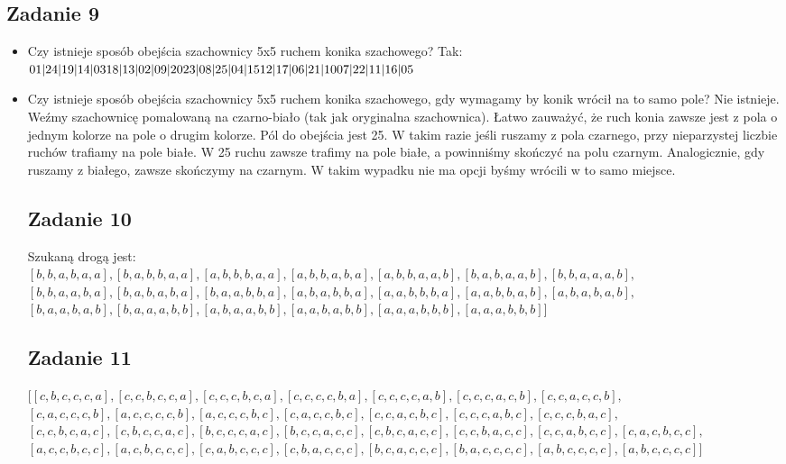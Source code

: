 \documentclass[a4paper]{article}
\begin{document}
\subsection*{Zadanie 9}
\begin{itemize}
\item Czy istnieje sposób obejścia szachownicy 5x5 ruchem konika szachowego?
Tak:\\

$
01|24|19|14|03 \\
18|13|02|09|20 \\
23|08|25|04|15 \\
12|17|06|21|10 \\
07|22|11|16|05 \\ 
$

\item Czy istnieje sposób obejścia szachownicy 5x5 ruchem konika szachowego, gdy wymagamy by konik wrócił na to samo pole?
Nie istnieje. Weźmy szachownicę pomalowaną na czarno-biało (tak jak oryginalna szachownica). Łatwo zauważyć, że ruch konia zawsze jest z pola o jednym kolorze na pole o drugim kolorze. Pól do obejścia jest 25. W takim razie jeśli ruszamy z pola czarnego, przy nieparzystej liczbie ruchów trafiamy na pole białe. W 25 ruchu zawsze trafimy na pole białe, a powinniśmy skończyć na polu czarnym. Analogicznie, gdy ruszamy z białego, zawsze skończymy na czarnym. W takim wypadku nie ma opcji byśmy wrócili w to samo miejsce.

\subsection*{Zadanie 10}
Szukaną drogą jest:\\
$
[b, b, a, b, a, a], [b, a, b, b, a, a], [a, b, b, b, a, a], [a, b, b, a, b, a], [a, b, b, a, a, b], [b, a, b, a, a, b], [b, b, a, a, a,b],$\\$ [b, b, a, a, b, a], [b, a, b, a, b, a], [b, a, a, b, b, a], [a, b, a, b, b, a], [a, a, b, b, b, a], [a, a, b, b, a, b], [a, b, a, b,a, b],$\\ $ [b, a, a, b, a, b], [b, a, a, a, b, b] , [a, b, a, a, b, b], [a, a, b, a, b, b], [a, a, a, b, b, b], [a, a, a, b, b, b]]
$

\subsection*{Zadanie 11}
$
[[c, b, c, c, c, a], [c, c, b, c, c, a], [c, c, c, b, c, a], [c, c, c, c, b, a], [c, c, c, c, a, b], [c, c, c, a, c, b], [c, c, a, c, c, b],$\\ $ [c,a, c, c, c, b], [a, c, c, c, c, b], [a, c, c, c, b, c], [c, a, c, c, b, c], [c, c, a, c, b, c], [c, c, c, a, b, c], [c, c, c, b, a, c],$\\ $ [c, c, b,c, a, c], [c, b, c, c, a, c], [b, c, c, c, a, c], [b, c, c, a, c, c], [c, b, c, a, c, c], [c, c, b, a, c, c], [c, c, a, b, c, c], [c, a, c, b, c,c],$\\ $ [a, c, c, b, c, c], [a, c, b, c, c, c], [c, a, b, c, c, c], [c, b, a, c, c, c], [b, c, a, c, c, c], [b, a, c, c, c, c], [a, b, c, c, c, c],[a, b, c, c, c, c]]
$

\end{itemize}
\end{document}
